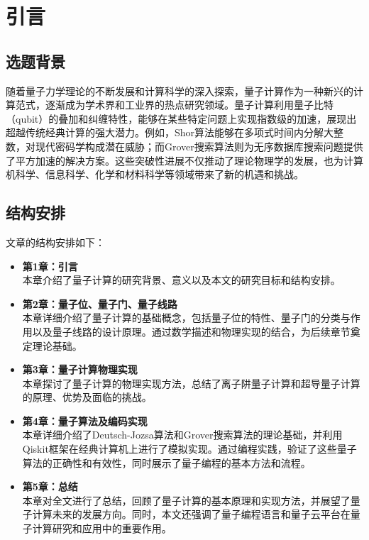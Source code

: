 \section{引言}
\subsection{选题背景}
随着量子力学理论的不断发展和计算科学的深入探索，量子计算作为一种新兴的计算范式，逐渐成为学术界和工业界的热点研究领域。量子计算利用量子比特（qubit）的叠加和纠缠特性，能够在某些特定问题上实现指数级的加速，展现出超越传统经典计算的强大潜力。例如，Shor算法能够在多项式时间内分解大整数，对现代密码学构成潜在威胁；而Grover搜索算法则为无序数据库搜索问题提供了平方加速的解决方案。这些突破性进展不仅推动了理论物理学的发展，也为计算机科学、信息科学、化学和材料科学等领域带来了新的机遇和挑战。

\subsection{结构安排}
文章的结构安排如下：

\begin{itemize}
    \item \textbf{第1章：引言} \\
    本章介绍了量子计算的研究背景、意义以及本文的研究目标和结构安排。
    
    \item \textbf{第2章：量子位、量子门、量子线路} \\
    本章详细介绍了量子计算的基础概念，包括量子位的特性、量子门的分类与作用以及量子线路的设计原理。通过数学描述和物理实现的结合，为后续章节奠定理论基础。
    
    \item \textbf{第3章：量子计算物理实现} \\
    本章探讨了量子计算的物理实现方法，总结了离子阱量子计算和超导量子计算的原理、优势及面临的挑战。
    
    \item \textbf{第4章：量子算法及编码实现} \\
    本章详细介绍了Deutsch-Jozsa算法和Grover搜索算法的理论基础，并利用Qiskit框架在经典计算机上进行了模拟实现。通过编程实践，验证了这些量子算法的正确性和有效性，同时展示了量子编程的基本方法和流程。
    
    \item \textbf{第5章：总结} \\
    本章对全文进行了总结，回顾了量子计算的基本原理和实现方法，并展望了量子计算未来的发展方向。同时，本文还强调了量子编程语言和量子云平台在量子计算研究和应用中的重要作用。
\end{itemize}
